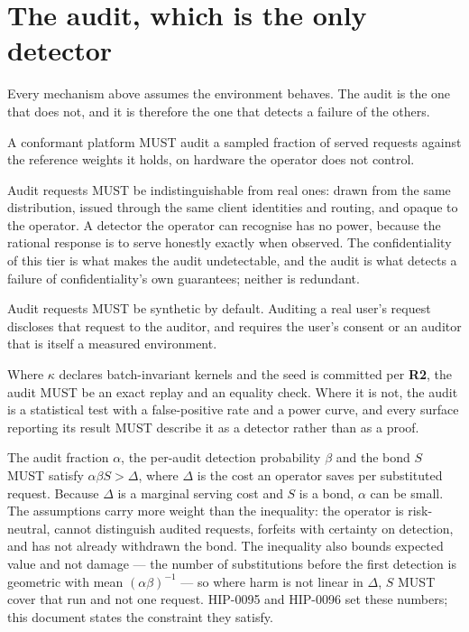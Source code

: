 \documentclass[11pt,a4paper]{article}
\newcommand{\req}[1]{\textbf{#1}}
\begin{document}
\section{The audit, which is the only detector}
\label{sec:audit}

Every mechanism above assumes the environment behaves. The audit is the one that
does not, and it is therefore the one that detects a failure of the others.

\begin{description}[leftmargin=1.6em]
\item[\req{A1}] A conformant platform MUST audit a sampled fraction of served
requests against the reference weights it holds, on hardware the operator does not
control.

\item[\req{A2}] Audit requests MUST be indistinguishable from real ones: drawn from
the same distribution, issued through the same client identities and routing, and
opaque to the operator. A detector the operator can recognise has no power, because
the rational response is to serve honestly exactly when observed. The
confidentiality of this tier is what makes the audit undetectable, and the audit is
what detects a failure of confidentiality's own guarantees; neither is redundant.

\item[\req{A3}] Audit requests MUST be synthetic by default. Auditing a real user's
request discloses that request to the auditor, and requires the user's consent or an
auditor that is itself a measured environment.

\item[\req{A4}] Where $\kappa$ declares batch-invariant kernels and the seed is
committed per \req{R2}, the audit MUST be an exact replay and an equality check.
Where it is not, the audit is a statistical test with a false-positive rate and a
power curve, and every surface reporting its result MUST describe it as a detector
rather than as a proof.

\item[\req{A5}] The audit fraction $\alpha$, the per-audit detection probability
$\beta$ and the bond $S$ MUST satisfy $\alpha \beta S > \Delta$, where $\Delta$ is
the cost an operator saves per substituted request. Because $\Delta$ is a marginal
serving cost and $S$ is a bond, $\alpha$ can be small. The assumptions carry more
weight than the inequality: the operator is risk-neutral, cannot distinguish audited
requests, forfeits with certainty on detection, and has not already withdrawn the
bond. The inequality also bounds expected value and not damage --- the number of
substitutions before the first detection is geometric with mean
$(\alpha\beta)^{-1}$ --- so where harm is not linear in $\Delta$, $S$ MUST cover
that run and not one request. HIP-0095 and HIP-0096 set these numbers; this document
states the constraint they satisfy.
\end{description}
\end{document}
